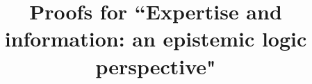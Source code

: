 \documentclass[sn-apa]{sn-jnl}%
\theoremstyle{thmstyleone}%
\theoremstyle{thmstyletwo}%
\theoremstyle{thmstylethree}%
\begin{document}
\newcommand{\appendixtitle}{Proofs for ``Expertise and information: an epistemic logic perspective"}
\title[\appendixtitle]{\appendixtitle}

\author[1]{ }
\author[1]{ }

\maketitle

\begin{appendices}
    
\end{appendices}

%
\end{document}
